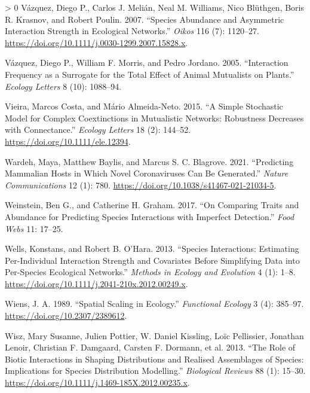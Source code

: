 \documentclass[10pt,oneside]{article}
\newlength{\cslhangindent}
\newenvironment{CSLReferences}[3] %
 {%
  \setlength{\parindent}{0pt}
  \ifodd #1 \everypar{\setlength{\hangindent}{\cslhangindent}}\ignorespaces\fi
  \ifnum #2 > 0
  \setlength{\parskip}{#2\baselineskip}
  \fi
 }%
 {}
\begin{document}
\begin{CSLReferences}{1}{0}
\leavevmode\hypertarget{ref-Vazquez2007SpeAbu}{}%
Vázquez, Diego P., Carlos J. Melián, Neal M. Williams, Nico Blüthgen,
Boris R. Krasnov, and Robert Poulin. 2007. {``Species Abundance and
Asymmetric Interaction Strength in Ecological Networks.''} \emph{Oikos}
116 (7): 1120--27.
\url{https://doi.org/10.1111/j.0030-1299.2007.15828.x}.

\leavevmode\hypertarget{ref-Vazquez2005IntFre}{}%
Vázquez, Diego P., William F. Morris, and Pedro Jordano. 2005.
{``Interaction Frequency as a Surrogate for the Total Effect of Animal
Mutualists on Plants.''} \emph{Ecology Letters} 8 (10): 1088--94.

\leavevmode\hypertarget{ref-Vieira2015SimSto}{}%
Vieira, Marcos Costa, and Mário Almeida-Neto. 2015. {``A Simple
Stochastic Model for Complex Coextinctions in Mutualistic Networks:
Robustness Decreases with Connectance.''} \emph{Ecology Letters} 18 (2):
144--52. \url{https://doi.org/10.1111/ele.12394}.

\leavevmode\hypertarget{ref-Wardeh2021PreMam}{}%
Wardeh, Maya, Matthew Baylis, and Marcus S. C. Blagrove. 2021.
{``Predicting Mammalian Hosts in Which Novel Coronaviruses Can Be
Generated.''} \emph{Nature Communications} 12 (1): 780.
\url{https://doi.org/10.1038/s41467-021-21034-5}.

\leavevmode\hypertarget{ref-Weinstein2017ComTra}{}%
Weinstein, Ben G., and Catherine H. Graham. 2017. {``On Comparing Traits
and Abundance for Predicting Species Interactions with Imperfect
Detection.''} \emph{Food Webs} 11: 17--25.

\leavevmode\hypertarget{ref-Wells2013SpeInt}{}%
Wells, Konstans, and Robert B. O'Hara. 2013. {``Species Interactions:
Estimating Per-Individual Interaction Strength and Covariates Before
Simplifying Data into Per-Species Ecological Networks.''} \emph{Methods
in Ecology and Evolution} 4 (1): 1--8.
\url{https://doi.org/10.1111/j.2041-210x.2012.00249.x}.

\leavevmode\hypertarget{ref-Wiens1989SpaSca}{}%
Wiens, J. A. 1989. {``Spatial Scaling in Ecology.''} \emph{Functional
Ecology} 3 (4): 385--97. \url{https://doi.org/10.2307/2389612}.

\leavevmode\hypertarget{ref-Wisz2013RolBio}{}%
Wisz, Mary Susanne, Julien Pottier, W. Daniel Kissling, Loïc Pellissier,
Jonathan Lenoir, Christian F. Damgaard, Carsten F. Dormann, et al. 2013.
{``The Role of Biotic Interactions in Shaping Distributions and Realised
Assemblages of Species: Implications for Species Distribution
Modelling.''} \emph{Biological Reviews} 88 (1): 15--30.
\url{https://doi.org/10.1111/j.1469-185X.2012.00235.x}.


\end{CSLReferences}
\end{document}
